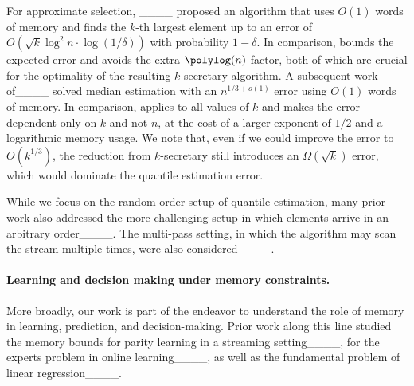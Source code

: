 For approximate selection, ____  proposed an algorithm that uses $O(1)$ words of memory and finds the $k$-th largest element up to an error of $O(\sqrt{k}\log^2 n\cdot\log(1/\delta))$ with probability $1 - \delta$. In comparison,  bounds the expected error and avoids the extra $\polylog(n)$ factor, both of which are crucial for the optimality of the resulting $k$-secretary algorithm. A subsequent work of____ solved median estimation with an $n^{1/3 + o(1)}$ error using $O(1)$ words of memory. In comparison,  applies to all values of $k$ and makes the error dependent only on $k$ and not $n$, at the cost of a larger exponent of $1/2$ and a logarithmic memory usage. We note that, even if we could improve the error to $O(k^{1/3})$, the reduction from $k$-secretary still introduces an $\Omega(\sqrt{k})$ error, which would dominate the quantile estimation error.

While we focus on the random-order setup of quantile estimation, many prior work also addressed the more challenging setup in which elements arrive in an arbitrary order____. The multi-pass setting, in which the algorithm may scan the stream multiple times, were also considered____.

\paragraph{Learning and decision making under memory constraints.} More broadly, our work is part of the endeavor to understand the role of memory in learning, prediction, and decision-making. Prior work along this line studied the memory bounds for parity learning in a streaming setting____, for the experts problem in online learning____, as well as the fundamental problem of linear regression____.